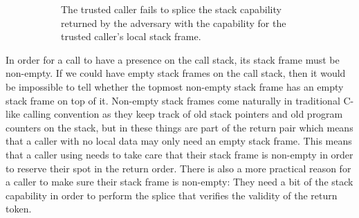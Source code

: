 \documentclass[acmsmall,review,anonymous]{acmart}\settopmatter{printfolios=true,printccs=false,printacmref=false}
\begin{document}
\begin{figure}
\begin{subfigure}{0.4\linewidth}
    \caption{The trusted caller fails to splice the stack capability returned by
    the adversary with the capability for the trusted caller's local stack frame.}
    \label{fig:ret-ptr-abuse-prev}
  \end{subfigure}
  \caption{}
\end{figure}

In order for a call to have a presence on the call stack, its stack frame must be non-empty.
If we could have empty stack frames on the call stack, then it would be impossible to tell whether the topmost non-empty stack frame has an empty stack frame on top of it.
Non-empty stack frames come naturally in traditional C-like calling convention as they keep track of old stack pointers and old program counters on the stack, but in \stktokens{} these things are part of the return pair which means that a caller with no local data may only need an empty stack frame.
This means that a caller using \stktokens{} needs to take care that their stack frame is non-empty in order to reserve their spot in the return order.
There is also a more practical reason for a \stktokens{} caller to make sure their stack frame is non-empty: They need a bit of the stack capability in order to perform the splice that verifies the validity of the return token.
\end{document}
